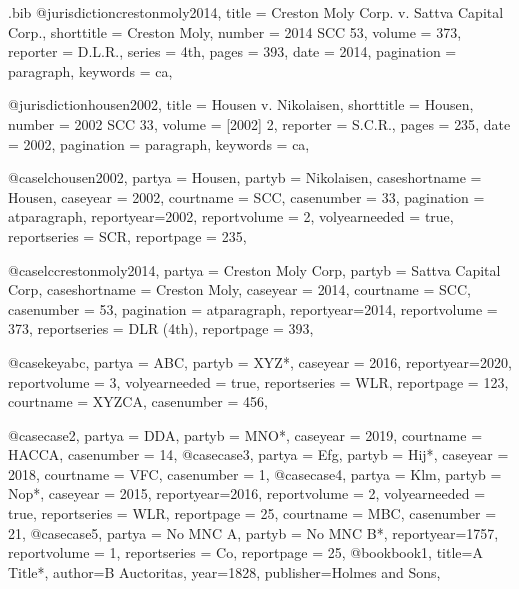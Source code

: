 \begin{filecontents*}[overwrite]{\jobname.bib}
@jurisdiction{crestonmoly2014,
title = {Creston Moly Corp. v. Sattva Capital Corp.},
shorttitle = {Creston Moly},
number = {2014 SCC 53},
volume = {373},
reporter = {D.L.R.},
series = {4th},
pages = {393},
date = {2014},
pagination = {paragraph},
keywords = {ca},
}

@jurisdiction{housen2002,
title = {Housen v. Nikolaisen},
shorttitle = {Housen},
number = {2002 SCC 33},
volume = {[2002] 2},
reporter = {S.C.R.},
pages = {235},
date = {2002},
pagination = {paragraph},
keywords = {ca},
}

@case{lchousen2002,
  partya = {Housen}, 
  partyb = {Nikolaisen},
  caseshortname = {Housen},
  caseyear = {2002},
  courtname = {SCC},
  casenumber = {33},
  pagination = {atparagraph},
  reportyear={2002},
  reportvolume = {2},
  volyearneeded = {true},
  reportseries = {SCR},
  reportpage = {235},
	}

@case{lccrestonmoly2014,
  partya = {Creston Moly Corp}, 
  partyb = {Sattva Capital Corp},
  caseshortname = {Creston Moly},
  caseyear = {2014},
  courtname = {SCC},
  casenumber = {53},
  pagination = {atparagraph},
  reportyear={2014},
  reportvolume = {373},
  reportseries = {DLR (4th)},
  reportpage = {393},
	}




@case{keyabc,
  partya = {ABC}, 
  partyb = {XYZ*},
  caseyear = {2016},
  reportyear={2020},
  reportvolume = {3},
  volyearneeded = {true},
  reportseries = {WLR},
  reportpage = {123},
  courtname = {XYZCA},
  casenumber = {456},
	}

@case{case2,
  partya = {DDA}, 
  partyb = {MNO*},
  caseyear = {2019},
  courtname = {HACCA},
  casenumber = {14},
	}
@case{case3,
  partya = {Efg}, 
  partyb = {Hij*},
  caseyear = {2018},
  courtname = {VFC},
  casenumber = {1},
	}
@case{case4,
  partya = {Klm}, 
  partyb = {Nop*},
  caseyear = {2015},
  reportyear={2016},
  reportvolume = {2},
  volyearneeded = {true},
  reportseries = {WLR},
  reportpage = {25},
  courtname = {MBC},
  casenumber = {21},
	}
@case{case5,
  partya = {No MNC A}, 
  partyb = {No MNC B*},
  reportyear={1757},
  reportvolume = {1},
  reportseries = {Co},
  reportpage = {25},
	}
@book{book1,
	title={A Title*},
	author={B Auctoritas},
	year={1828},
	publisher={Holmes and Sons},
	}




\end{filecontents*}
